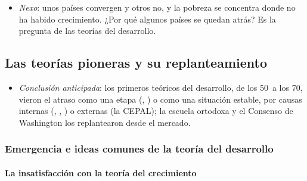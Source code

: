 \documentclass[11pt]{article}
\begin{document}
\begin{itemize}
\item \emph{Nexo}: unos países convergen y otros no, y la pobreza se concentra donde no ha habido crecimiento. ¿Por qué algunos países se quedan atrás? Es la pregunta de las teorías del desarrollo.
\end{itemize}

\subsection{Las teorías pioneras y su replanteamiento}\label{sec:clasicas}

\begin{itemize}
\item \emph{Conclusión anticipada}: los primeros teóricos del desarrollo, de los 50~a los 70, vieron el atraso como una etapa (, ) o como una situación estable, por causas internas (, , ) o externas (la CEPAL); la escuela ortodoxa y el Consenso de Washington los replantearon desde el mercado.
\end{itemize}

\subsubsection{Emergencia e ideas comunes de la teoría del desarrollo}\label{sec:emergencia}

\paragraph{La insatisfacción con la teoría del crecimiento}
\end{document}
